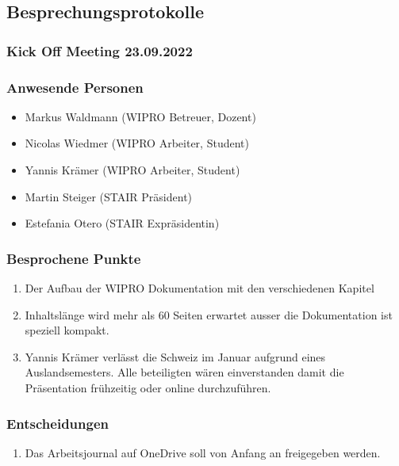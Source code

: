 \documentclass[a4paper, table]{article}
\begin{document}
\subsection{Besprechungsprotokolle}

\subsubsection{Kick Off Meeting 23.09.2022}

\subsubsection*{Anwesende Personen}

\begin{itemize}
    \item Markus Waldmann (WIPRO Betreuer, Dozent)
    \item Nicolas Wiedmer (WIPRO Arbeiter, Student)
    \item Yannis Krämer (WIPRO Arbeiter, Student)
    \item Martin Steiger (STAIR Präsident)
    \item Estefania Otero (STAIR Expräsidentin)
\end{itemize}

\subsubsection*{Besprochene Punkte}

\begin{enumerate}
    \item Der Aufbau der WIPRO Dokumentation mit den verschiedenen Kapitel
    \item Inhaltslänge wird mehr als 60 Seiten erwartet ausser die Dokumentation ist speziell kompakt.
    \item Yannis Krämer verlässt die Schweiz im Januar aufgrund eines Auslandsemesters. Alle beteiligten wären einverstanden damit die Präsentation frühzeitig oder online durchzuführen.
\end{enumerate}

\subsubsection*{Entscheidungen}

\begin{enumerate}
    \item Das Arbeitsjournal auf OneDrive soll von Anfang an freigegeben werden.
\end{enumerate}
\end{document}
